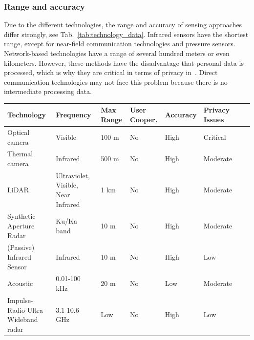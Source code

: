 \subsubsection{Range and accuracy}
Due to the different technologies, the range and accuracy of sensing approaches differ strongly, see Tab.~\ref{tab:technology_data}. Infrared sensors have the shortest range, except for near-field communication technologies and pressure sensors. Network-based technologies have a range of several hundred meters or even kilometers. However, these methods have the disadvantage that personal data is processed, which is why they are critical in terms of privacy in~\cite{darsena-2023-cdyn}. Direct communication technologies may not face this problem because  there is no intermediate processing data.


\begin{table}[hbt!]
\begin{footnotesize}
\begin{tabular}{p{45mm}p{25mm}p{10mm}p{12mm}p{10mm}p{10mm}p{10mm}p{10mm}}
 \hline
        Technology & Frequency & Max Range & User Cooper. & Accuracy & Privacy Issues\\
        \hline
        Optical camera & Visible & 100 m & No & High & Critical  \\ 
        Thermal camera & Infrared & 500 m  & No & High & Moderate\\
        LiDAR & Ultraviolet, Visible, Near Infrared & 1 km  & No & High & Moderate  \\
        Synthetic Aperture Radar & Ku/Ka band & 10 m  & No & High  & Moderate  \\ \hline
        (Passive) Infrared Sensor & Infrared & 10 m  & No & High & Low  \\
        Acoustic & 0.01-100 kHz & 20 m  & No & Low & Moderate \\
        Impulse-Radio Ultra-Wideband radar  & 3.1-10.6 GHz  & Low & No & High  & Low \\
        

\end{tabular}
\end{footnotesize}
\end{table}
